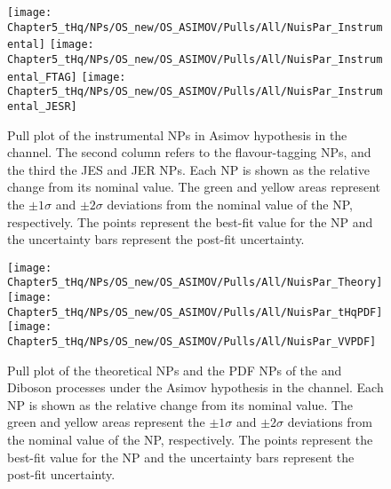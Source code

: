 \begin{figure}[h]
  \texttt{[image: Chapter5\_tHq/NPs/OS\_new/OS\_ASIMOV/Pulls/All/NuisPar\_Instrumental]}
  \texttt{[image: Chapter5\_tHq/NPs/OS\_new/OS\_ASIMOV/Pulls/All/NuisPar\_Instrumental\_FTAG]}
  \texttt{[image: Chapter5\_tHq/NPs/OS\_new/OS\_ASIMOV/Pulls/All/NuisPar\_Instrumental\_JESR]}
 
\caption{Pull plot of the instrumental NPs in Asimov hypothesis in the \dilepOStau channel.
   The second column refers to the flavour-tagging NPs, and the third the JES and JER NPs. 
   Each NP is shown as the relative change from its nominal value.
   The green and yellow areas represent the $\pm1\sigma$ and $\pm2\sigma$ deviations from the nominal value of the NP, respectively. 
   The points represent the best-fit value for the NP and the uncertainty bars represent the post-fit uncertainty.} 
\label{fig:ChaptH:Asimov:OS:InstrumentalNPs}
\end{figure}




\begin{figure}[h]
\centering
	\texttt{[image: Chapter5\_tHq/NPs/OS\_new/OS\_ASIMOV/Pulls/All/NuisPar\_Theory]}
	\texttt{[image: Chapter5\_tHq/NPs/OS\_new/OS\_ASIMOV/Pulls/All/NuisPar\_tHqPDF]}
  	\texttt{[image: Chapter5\_tHq/NPs/OS\_new/OS\_ASIMOV/Pulls/All/NuisPar\_VVPDF]}
\caption{Pull plot of the theoretical NPs and the PDF NPs of the \tHq and Diboson processes under the 
   Asimov hypothesis in the \dilepOStau channel.
   Each NP is shown as the relative change from its nominal value.
   The green and yellow areas represent the $\pm1\sigma$ and $\pm2\sigma$ deviations from the nominal value of the NP, respectively. 
   The points represent the best-fit value for the NP and the uncertainty bars represent the post-fit uncertainty.} 
\label{fig:ChaptH:Asimov:OS:TheoryNPs_1}
\end{figure}

